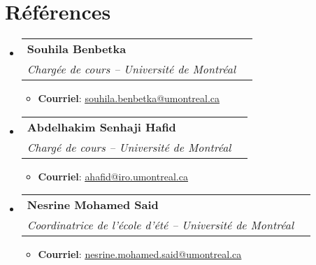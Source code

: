 \documentclass[letterpaper,11pt]{article}
\makeatletter
\newcommand{\resumeItem}[1]{
  \item\small{
    {#1 \vspace{-2pt}}
  }
}
\newcommand{\resumeSubheading}[4]{
  \vspace{-2pt}\item
    \begin{tabular*}{0.97\textwidth}[t]{l@{\extracolsep{\fill}}r}
      \textbf{#1} & #2 \\
      \textit{\small#3} & \textit{\small #4} \\
    \end{tabular*}\vspace{-7pt}
}
\newcommand{\resumeItemListStart}{\begin{itemize}}
\newcommand{\resumeItemListEnd}{\end{itemize}\vspace{-5pt}}
\makeatother
\begin{document}
\section{Références}
 \begin{itemize}[leftmargin=0.15in, label={}]
     \resumeSubheading
         {Souhila Benbetka}{}{Chargée de cours -- Université de Montréal}{}
         \resumeItemListStart
             \resumeItem{\textbf{Courriel}: \href{mailto:souhila.benbetka@umontreal.ca}{\underline{souhila.benbetka@umontreal.ca}}}
         \resumeItemListEnd
         
     \resumeSubheading
         {Abdelhakim Senhaji Hafid}{}{Chargé de cours -- Université de Montréal}{}
         \resumeItemListStart
             \resumeItem{\textbf{Courriel}: \href{mailto:ahafid@iro.umontreal.ca}{\underline{ahafid@iro.umontreal.ca}}}
         \resumeItemListEnd
         
     \resumeSubheading
         {Nesrine Mohamed Said}{}{Coordinatrice de l'école d'été -- Université de Montréal}{}
         \resumeItemListStart
             \resumeItem{\textbf{Courriel}: \href{mailto:nesrine.mohamed.said@umontreal.ca}{\underline{nesrine.mohamed.said@umontreal.ca}}}
         \resumeItemListEnd
 \end{itemize}



\end{document}
